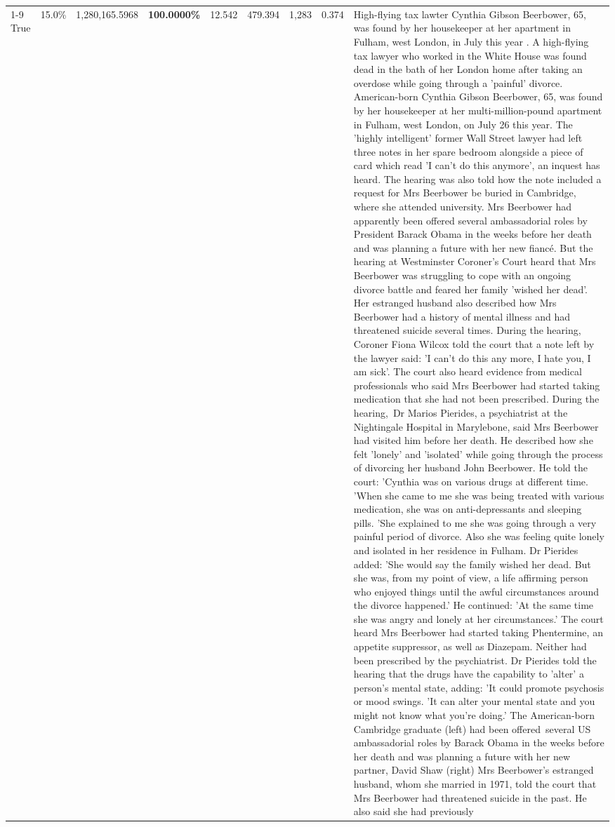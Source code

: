 \begin{table}[H]
\begin{tabular}{lllrlllll}
\cline{1-9}
True & 15.0\% & 1,280,165.5968 & \bfseries \color{red} 100.0000\% & 12.542 & 479.394 & 1,283 & 0.374 & High-flying tax lawter Cynthia Gibson Beerbower, 65, was found by her housekeeper at her apartment in Fulham, west London, in July this year . A high-flying tax lawyer who worked in the White House was found dead in the bath of her London home after taking an overdose while going through a 'painful' divorce. American-born Cynthia Gibson Beerbower, 65, was found by her housekeeper at her multi-million-pound apartment in Fulham, west London, on July 26 this year. The 'highly intelligent' former Wall Street lawyer had left three notes in her spare bedroom alongside a piece of card which read 'I can't do this anymore', an inquest has heard. The hearing was also told how the note included a request for Mrs Beerbower be buried in Cambridge, where she attended university. Mrs Beerbower had apparently been offered several ambassadorial roles by President Barack Obama in the weeks before her death and was planning a future with her new fiancé. But the hearing at Westminster Coroner's Court heard that Mrs Beerbower was struggling to cope with an ongoing divorce battle and feared her family 'wished her dead'. Her estranged husband also described how Mrs Beerbower had a history of mental illness and had threatened suicide several times. During the hearing, Coroner Fiona Wilcox told the court that a note left by the lawyer said: 'I can't do this any more, I hate you, I am sick'. The court also heard evidence from medical professionals who said Mrs Beerbower had started taking medication that she had not been prescribed. During the hearing, Dr Marios Pierides, a psychiatrist at the Nightingale Hospital in Marylebone, said Mrs Beerbower had visited him before her death. He described how she felt 'lonely' and 'isolated' while going through the process of divorcing her husband John Beerbower. He told the court: 'Cynthia was on various drugs at different time. 'When she came to me she was being treated with various medication, she was on anti-depressants and sleeping pills. 'She explained to me she was going through a very painful period of divorce. Also she was feeling quite lonely and isolated in her residence in Fulham. Dr Pierides added: 'She would say the family wished her dead. But she was, from my point of view, a life affirming person who enjoyed things until the awful circumstances around the divorce happened.' He continued: 'At the same time she was angry and lonely at her circumstances.' The court heard Mrs Beerbower had started taking Phentermine, an appetite suppressor, as well as Diazepam. Neither had been prescribed by the psychiatrist. Dr Pierides told the hearing that the drugs have the capability to 'alter' a person's mental state, adding: 'It could promote psychosis or mood swings. 'It can alter your mental state and you might not know what you're doing.' The American-born Cambridge graduate (left) had been offered several US ambassadorial roles by Barack Obama in the weeks before her death and was planning a future with her new partner, David Shaw (right) Mrs Beerbower's estranged husband, whom she married in 1971, told the court that Mrs Beerbower had threatened suicide in the past. He also said she had previously 
\end{tabular}
\end{table}
